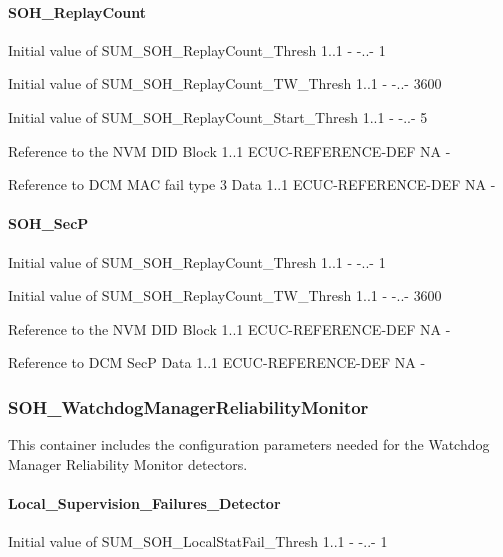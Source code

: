 {{{{{{{{{{{{{\paragraph{SOH_ReplayCount}

{
{Initial value of SUM_SOH_ReplayCount_Thresh}
{1..1}
{-}
{-..-}
{1}}

{
{Initial value of SUM_SOH_ReplayCount_TW_Thresh}
{1..1}
{-}
{-..-}
{3600}}

{
{Initial value of SUM_SOH_ReplayCount_Start_Thresh}
{1..1}
{-}
{-..-}
{5}}

{
{Reference to the NVM DID Block}
{1..1}
{ECUC-REFERENCE-DEF}
{NA}
{-}}

{
{Reference to DCM MAC fail type 3 Data}
{1..1}
{ECUC-REFERENCE-DEF}
{NA}
{-}}

\paragraph{SOH_SecP}

{
{Initial value of SUM_SOH_ReplayCount_Thresh}
{1..1}
{-}
{-..-}
{1}}

{
{Initial value of SUM_SOH_ReplayCount_TW_Thresh}
{1..1}
{-}
{-..-}
{3600}}

{
{Reference to the NVM DID Block}
{1..1}
{ECUC-REFERENCE-DEF}
{NA}
{-}}

{
{Reference to DCM SecP Data}
{1..1}
{ECUC-REFERENCE-DEF}
{NA}
{-}}

\subsubsection{SOH\_WatchdogManagerReliabilityMonitor}
This container includes the configuration parameters needed for the Watchdog Manager Reliability Monitor detectors.


\paragraph{Local\_Supervision\_Failures\_Detector}
{
{Initial value of SUM_SOH_LocalStatFail_Thresh}
{1..1}
{-}
{-..-}
{1}}


}}}}}}}}}}}}}
